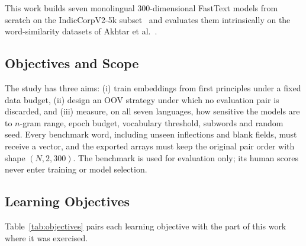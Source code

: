 \documentclass[conference,10pt]{IEEEtran}
\begin{document}
This work builds seven monolingual 300-dimensional FastText models from scratch on the IndicCorpV2-5k subset~\cite{doddapaneni2023} and evaluates them intrinsically on the word-similarity datasets of Akhtar et al.~\cite{akhtar2017}.

\subsection{Objectives and Scope}
The study has three aims: (i) train embeddings from first principles under a fixed data budget, (ii) design an OOV strategy under which no evaluation pair is discarded, and (iii) measure, on all seven languages, how sensitive the models are to $n$-gram range, epoch budget, vocabulary threshold, subwords and random seed. Every benchmark word, including unseen inflections and blank fields, must receive a vector, and the exported arrays must keep the original pair order with shape $(N, 2, 300)$. The benchmark is used for evaluation only; its human scores never enter training or model selection.

\subsection{Learning Objectives}
Table~\ref{tab:objectives} pairs each learning objective with the part of this work where it was exercised.
\end{document}
